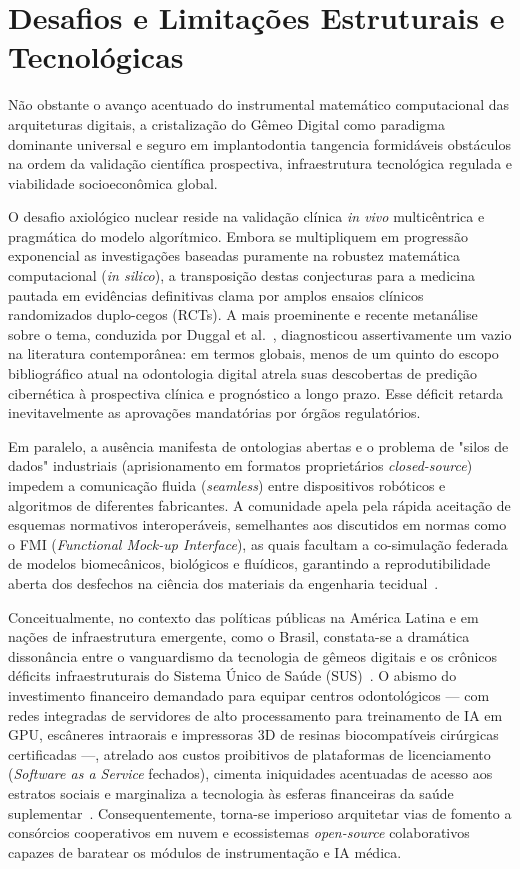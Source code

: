 \section{Desafios e Limitações Estruturais e Tecnológicas}

Não obstante o avanço acentuado do instrumental matemático computacional das arquiteturas digitais, a cristalização do Gêmeo Digital como paradigma dominante universal e seguro em implantodontia tangencia formidáveis obstáculos na ordem da validação científica prospectiva, infraestrutura tecnológica regulada e viabilidade socioeconômica global.

O desafio axiológico nuclear reside na validação clínica \textit{in vivo} multicêntrica e pragmática do modelo algorítmico. Embora se multipliquem em progressão exponencial as investigações baseadas puramente na robustez matemática computacional (\textit{in silico}), a transposição destas conjecturas para a medicina pautada em evidências definitivas clama por amplos ensaios clínicos randomizados duplo-cegos (RCTs). A mais proeminente e recente metanálise sobre o tema, conduzida por Duggal et al.~\cite{duggal2026exploring}, diagnosticou assertivamente um vazio na literatura contemporânea: em termos globais, menos de um quinto do escopo bibliográfico atual na odontologia digital atrela suas descobertas de predição cibernética à prospectiva clínica e prognóstico a longo prazo. Esse déficit retarda inevitavelmente as aprovações mandatórias por órgãos regulatórios.

Em paralelo, a ausência manifesta de ontologias abertas e o problema de "silos de dados" industriais (aprisionamento em formatos proprietários \textit{closed-source}) impedem a comunicação fluida (\textit{seamless}) entre dispositivos robóticos e algoritmos de diferentes fabricantes. A comunidade apela pela rápida aceitação de esquemas normativos interoperáveis, semelhantes aos discutidos em normas como o FMI (\textit{Functional Mock-up Interface}), as quais facultam a co-simulação federada de modelos biomecânicos, biológicos e fluídicos, garantindo a reprodutibilidade aberta dos desfechos na ciência dos materiais da engenharia tecidual~\cite{infante2024fmi, infante2025distributed}.

Conceitualmente, no contexto das políticas públicas na América Latina e em nações de infraestrutura emergente, como o Brasil, constata-se a dramática dissonância entre o vanguardismo da tecnologia de gêmeos digitais e os crônicos déficits infraestruturais do Sistema Único de Saúde (SUS)~\cite{frota2025sus}. O abismo do investimento financeiro demandado para equipar centros odontológicos — com redes integradas de servidores de alto processamento para treinamento de IA em GPU, escâneres intraorais e impressoras 3D de resinas biocompatíveis cirúrgicas certificadas —, atrelado aos custos proibitivos de plataformas de licenciamento (\textit{Software as a Service} fechados), cimenta iniquidades acentuadas de acesso aos estratos sociais e marginaliza a tecnologia às esferas financeiras da saúde suplementar~\cite{cuadros2023access}. Consequentemente, torna-se imperioso arquitetar vias de fomento a consórcios cooperativos em nuvem e ecossistemas \textit{open-source} colaborativos capazes de baratear os módulos de instrumentação e IA médica.

